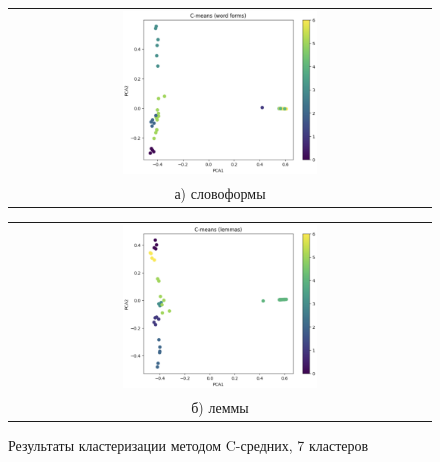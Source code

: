 \begin{figure}
	\begin{tabular}[b]{c}
		\includegraphics[width=0.475\textwidth]{images/7.png} \\
		\small а) словоформы
	\end{tabular}
	\begin{tabular}[b]{c}
		\includegraphics[width=0.475\textwidth]{images/8.png} \\
		\small б) леммы
	\end{tabular}
	\caption{Результаты кластеризации методом C-средних, 7 кластеров}
	\label{img:4}
\end{figure}

